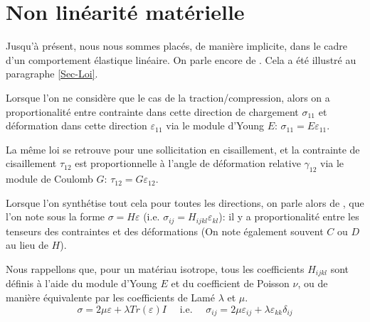 \medskip
\section{Non linéarité matérielle}\label{Sec-NLMat}

Jusqu'à présent, nous nous sommes placés, de manière implicite, dans le cadre d'un comportement
élastique linéaire. On parle encore de .
Cela a été illustré au paragraphe \ref{Sec-Loi}.

Lorsque l'on ne considère que le cas de la traction/compression, alors on a proportionalité entre
contrainte dans cette direction de chargement $\sigma_{11}$ et déformation dans cette direction
$\varepsilon_{11}$ via le module d'Young $E$:
$\sigma_{11}=E\varepsilon_{11}$.

La même loi se retrouve pour une sollicitation en cisaillement, et la contrainte de cisaillement $\tau_{12}$
est proportionnelle à l'angle de déformation relative $\gamma_{12}$ via le module de 
Coulomb $G$:
$\tau_{12}=G\varepsilon_{12}$.

Lorsque l'on synthétise tout cela pour toutes les directions, on parle alors de , 
que l'on note sous la forme $\sigma=H\varepsilon$ (i.e. $\sigma_{ij}=H_{ijkl}\varepsilon_{kl}$): 
il y a proportionalité entre les tenseurs des contraintes et des déformations (On note également 
souvent $C$ ou $D$ au lieu de $H$).

\medskip
Nous rappellons que, pour un matériau isotrope, tous les coefficients $H_{ijkl}$ sont définis
à l'aide du module d'Young $E$ 
et du coefficient de Poisson $\nu$, 
ou de manière équivalente par les coefficients de Lamé 
$\lambda$ et $\mu$.
\begin{equation}\sigma = 2\mu\varepsilon+\lambda Tr(\varepsilon)I \quad \text{ i.e. } \quad
\sigma_{ij}=2\mu\varepsilon_{ij}+\lambda\varepsilon_{kk}\delta_{ij}\end{equation}

